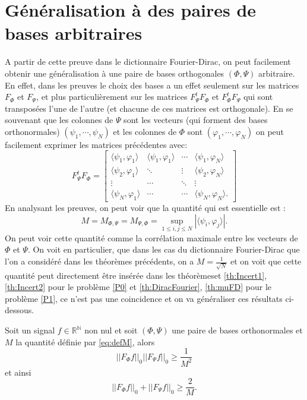 \section{Généralisation à des paires de bases arbitraires}
	A partir de cette preuve dans le dictionnaire Fourier-Dirac, on peut facilement obtenir une généralisation à une paire de bases orthogonales $(\Phi, \Psi)$ arbitraire.
	En effet, dans les preuves le choix des bases a un effet seulement sur les matrices $F_{\Phi}$ et $F_{\Psi}$, et plus particulièrement sur les matrices $F_{\Psi}^t F_{\Phi}$ et $F_{\Phi}^t F_{\Psi}$ qui sont transposées l'une de l'autre (et chacune de ces matrices est orthogonale).
	En se souvenant que les colonnes de $\Psi$ sont les vecteurs (qui forment des bases orthonormales) $(\psi_1, \cdots, \psi_N)$ et les colonnes de $\Phi$ sont $(\varphi_1,\cdots,\varphi_N)$ on peut facilement exprimer les matrices précédentes avec:
	\begin{equation}
		F_{\Psi}^tF_{\Phi} = \begin{bmatrix}
			\langle \psi_1, \varphi_1 \rangle & 	\langle \psi_1, \varphi_1 \rangle	&\cdots 	&	\langle \psi_1, \varphi_N \rangle\\
			\langle \psi_2, \varphi_1 \rangle & 	\ddots 					& \vdots 	&	\langle \psi_2, \varphi_N \rangle \\
			\vdots 				& \cdots 				&\ddots 	 	&	\vdots \\
			\langle \psi_N, \varphi_1 \rangle & \cdots 				& \cdots 		&	 \langle \psi_N, \varphi_N \rangle. 
		\end{bmatrix}
	\end{equation}
	En analysant les preuves, on peut voir que la quantité qui est essentielle est :
	\begin{equation}\label{eq:defM}
		M = M_{\Phi, \Psi} = M_{\Psi, \Phi} = \sup_{1\leq i,j\leq N} |\langle \psi_i, \varphi_j \rangle|.
	\end{equation}
	On peut voir cette quantité comme la corrélation maximale entre les vecteurs de $\Phi$ et $\Psi$.
	\newline
	On voit en particulier, que dans les cas du dictionnaire Fourier-Dirac que l'on a considéré dans les théorèmes précédents, on a $M=\frac{1}{\sqrt{N}}$ et on voit que cette quantité peut directement être insérée dans les théorèmeset \ref{th:Incert1}, \ref{th:Incert2} pour le problème \ref{P0} et \ref{th:DiracFourier}, \ref{th:muFD} pour le problème \ref{P1}, ce n'est pas une coincidence et on va généraliser ces résultats ci-dessous.
	\begin{theoreme}\label{th:IncertGen1}
		Soit un signal $f\in \mathbb{R^N}$ non nul et soit $(\Phi, \Psi)$ une paire de bases orthonormales et $M$ la quantité définie par \ref{eq:defM}, alors
		\begin{equation}
			||F_\Phi f||_0 ||F_\Psi f||_0 \geq \frac{1}{M^2} 	
		\end{equation}
		et ainsi
		\begin{equation}
			||F_\Phi f||_0 + ||F_\Psi f||_0 \geq \frac{2}{M}. 	
		\end{equation}
	\end{theoreme}
